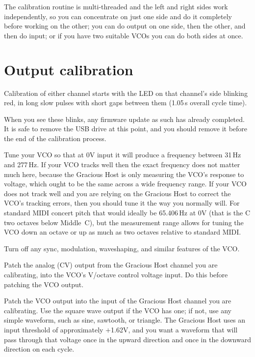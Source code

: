 The calibration routine is multi-threaded and the left and right sides work
independently, so you can concentrate on just one side and do it completely
before working on the other; you can do output on one side, then the other,
and then do input; or if you have two suitable VCOs you can do both sides at
once.

\section{Output calibration}

Calibration of either channel starts with the LED on that channel's side
blinking red, in long slow pulses with short gaps between them (1.05\,s
overall cycle time).


When you see these blinks, any firmware update as such has already
completed.  It is safe to remove the USB drive at this point, and you should
remove it before the end of the calibration process.

Tune your VCO so that at 0V input it will produce a frequency between 31\,Hz
and 277\,Hz.  If your VCO tracks well then the exact frequency does not
matter much here, because the Gracious Host is only measuring the VCO's
response to voltage, which ought to be the same across a wide frequency
range.  If your VCO does not track well and you are relying on the Gracious
Host to correct the VCO's tracking errors, then you should tune it the way
you normally will.  For standard MIDI concert pitch that would ideally be
65.406\,Hz at 0V (that is the C two octaves below Middle~C), but the
measurement range allows for tuning the VCO down an octave or up as much as
two octaves relative to standard MIDI.

Turn off any sync, modulation, waveshaping, and similar features of the VCO. 

Patch the analog (CV) output from the Gracious Host channel you are
calibrating, into the VCO's V/octave control voltage input.  Do this before
patching the VCO output.

Patch the VCO output into the input of the Gracious Host channel you are
calibrating.  Use the square wave output if the VCO has one; if not, use any
simple waveform, such as sine, sawtooth, or triangle.  The Gracious Host
uses an input threshold of approximately $+$1.62V, and you want a waveform
that will pass through that voltage once in the upward direction and once in
the downward direction on each cycle.

